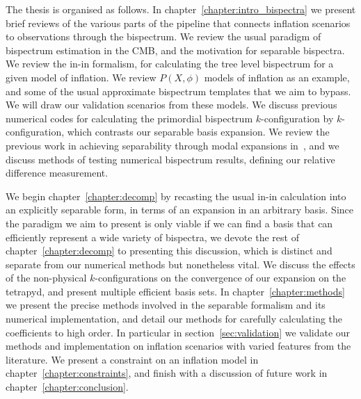 The thesis is organised as follows. In chapter~\ref{chapter:intro_bispectra} we present brief reviews
of the various parts of the pipeline that connects inflation scenarios to observations
through the bispectrum.
We review the usual paradigm of bispectrum estimation in the CMB,
and the motivation for separable bispectra. We review the in-in formalism,
for calculating the tree level bispectrum for a given model of inflation.
We review $P(X,\phi)$ models of inflation as an example, and
some of the usual approximate bispectrum templates
that we aim to bypass.
We will draw our validation scenarios from these models.
We discuss previous numerical codes for
calculating the primordial bispectrum $k$-configuration by $k$-configuration,
which contrasts our separable basis expansion.
We review the previous work in achieving separability through modal expansions
in~\cite{Funakoshi},
and we discuss methods of testing
numerical bispectrum results, defining our relative difference measurement.


We begin chapter~\ref{chapter:decomp} by recasting the usual in-in calculation into an explicitly separable form,
in terms of an expansion in an arbitrary basis.
Since the paradigm we aim to present is only viable if we can find a basis
that can efficiently represent a wide variety of bispectra,
we devote the rest of chapter~\ref{chapter:decomp} to presenting this discussion, which is
distinct and separate from our numerical methods but nonetheless vital.
We discuss the effects of the
non-physical $k$-configurations on the convergence of our expansion on
the tetrapyd, and present multiple efficient basis sets.
In chapter~\ref{chapter:methods} we present the precise methods involved in the
separable formalism and its numerical implementation,
and detail our methods for carefully calculating the coefficients to high order.
In particular in section~\ref{sec:validation} we validate our methods and implementation
on inflation scenarios with varied features from the literature.
We present a constraint on an inflation model in chapter~\ref{chapter:constraints},
and finish with a discussion of future work in chapter~\ref{chapter:conclusion}.

